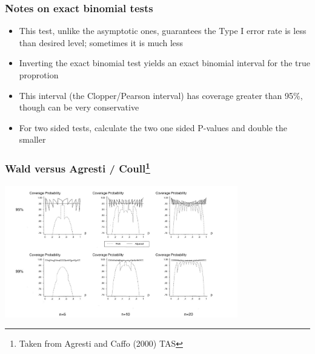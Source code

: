\documentclass[aspectratio=169]{beamer}
\begin{document}
\begin{frame}\frametitle{Notes on exact binomial tests}
  \begin{itemize}
  \item This test, unlike the asymptotic ones, guarantees the Type I error rate
    is less than desired level; sometimes it is much less
  \item Inverting the exact binomial test yields an exact binomial
    interval for the true proprotion 
  \item This interval (the Clopper/Pearson interval) has coverage greater
    than 95\%, though can be very conservative
  \item For two sided tests, calculate the two one sided P-values and double the
    smaller
  \end{itemize}
\end{frame}

\begin{frame}\frametitle{Wald versus Agresti / Coull\footnote{Taken from Agresti and Caffo (2000) TAS }}
\begin{center}
\includegraphics[width=4in]{waldCoverage.pdf}
\end{center}
\end{frame}
\end{document}
